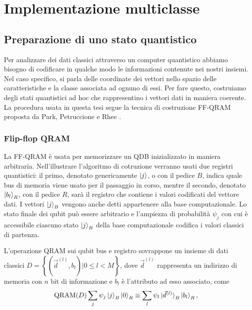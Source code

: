 \chapter{Implementazione multiclasse}\label{ch:implementazione}

\section{Preparazione di uno stato quantistico}

Per analizzare dei dati classici attraverso un computer quantistico 
abbiamo bisogno di codificare in qualche modo le informazioni 
contenute nei nostri insiemi. Nel caso specifico, si parla delle 
coordinate dei vettori nello spazio delle caratteristiche e la 
classe associata ad ognuno di essi. 
Per fare questo, costruiamo degli stati quantistici 
ad hoc che rappresentino i vettori dati in maniera coerente. 
La procedura usata in questa tesi segue la tecnica di costruzione 
\ac{FF-QRAM} proposta da Park, Petruccione e Rhee \cite{petruccione}. 

\subsection{Flip-flop QRAM} \label{sec:ff-qram}

La \ac{FF-QRAM} è usata per memorizzare un \ac{QDB} inizializzato in maniera arbitraria. 
Nell'illustrare l'algoritmo di cotruzione verranno usati due registri quantistici: 
il primo, denotato genericamente $\ket{j}$, o con il pedice $B$, indica quale bus 
di memoria viene usato per il passaggio in corso, mentre il secondo, denotato 
$\ket{b_l}_R$, con il pedice $R$, sarà il registro che contiene i 
valori codificati del vettore dati. 
I vettori $\ket{j}_B$ vengono anche detti appartenere alla base computazionale. 
Lo stato finale dei qubit può essere 
arbitrario e l'ampiezza di probabilità $\psi_j$ con cui è accessibile ciascuno stato 
$\ket{j}_B$ della base computazionale codifica i valori classici di partenza. 

L'operazione QRAM sui qubit bus e registro sovrappone un insieme di dati classici 
$D = \left\{ \left( \vec{d}^{(l)}, b_l \right) | 0 \leq l < M \right\}$, dove 
$\vec{d}^{(l)}$ rappresenta un indirizzo di memoria con $n$ bit di informazione 
e $b_l$ è l'attributo ad esso associato, come 
\begin{equation} \label{eq:qram}
    \text{QRAM}(D) \sum_j \psi_j \ket{j}_B \ket{0}_R \equiv 
    \sum_l \psi_l \ket{\vec{d}^{(l)}}_B \ket{b_l}_R,
\end{equation}


